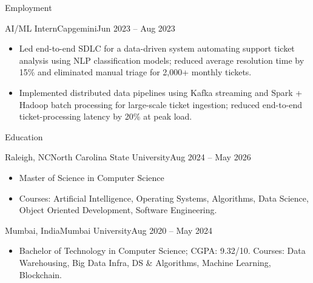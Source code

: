\documentclass[]{mcdowellcv}
\begin{document}
\begin{cvsection}{Employment}
  \begin{cvsubsection}{AI/ML Intern}{Capgemini}{Jun 2023 -- Aug 2023}
    \begin{itemize}
      \item Led end-to-end SDLC for a data-driven system automating support ticket analysis using NLP classification models; reduced average resolution time by 15\% and eliminated manual triage for 2,000+ monthly tickets.
      \item Implemented distributed data pipelines using Kafka streaming and Spark + Hadoop batch processing for large-scale ticket ingestion; reduced end-to-end ticket-processing latency by 20\% at peak load.
    \end{itemize}
    \vspace{-1.5pt}
  \end{cvsubsection}
\end{cvsection}

\begin{cvsection}{Education}
  \begin{cvsubsection}{Raleigh, NC}{North Carolina State University}{Aug 2024 -- May 2026}
    \begin{itemize}
      \item Master of Science in Computer Science
      \item Courses: Artificial Intelligence, Operating Systems, Algorithms, Data Science, Object Oriented Development, Software Engineering.
    \end{itemize}
    \vspace{-1.5pt}
  \end{cvsubsection}

  \begin{cvsubsection}{Mumbai, India}{Mumbai University}{Aug 2020 -- May 2024}
    \begin{itemize}
      \item Bachelor of Technology in Computer Science; CGPA: 9.32/10. Courses: Data Warehousing, Big Data Infra, DS \& Algorithms, Machine Learning, Blockchain.
    \end{itemize}
    \vspace{-1.5pt}
  \end{cvsubsection}
\end{cvsection}
\end{document}
